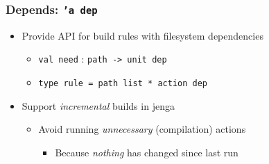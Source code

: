 \documentclass{beamer}
\begin{document}



\begin{frame}[fragile]
\huge
\begin{center}
\end{center}
\end{frame}

% 


\begin{frame}[fragile]
\frametitle{Depends: {\tt 'a dep}}
\begin{itemize}
\item Provide API for build rules with filesystem dependencies
\begin{itemize}
\item {\tt val need} : {\tt path -> unit dep}
\item {\tt type rule = path list * action dep}
\end{itemize}
\vspace*{.2cm}
\item Support {\em incremental}\/ builds in jenga
\begin{itemize}
\item Avoid running {\em unnecessary} (compilation) actions
\begin{itemize}
\item Because {\em nothing} has changed since last run
\end{itemize}
\end{itemize}
\end{itemize}
\end{frame}

\end{document}

